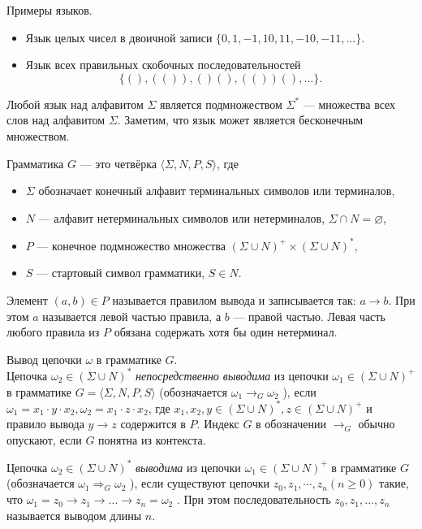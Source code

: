 \begin{example}
	
	Примеры языков.
	
	\begin{itemize}
		\item Язык целых чисел в двоичной записи $\{0, 1, -1, 10, 11, -10, -11, \dots\}.$
		\item Язык всех правильных скобочных последовательностей $$\{(), (()), ()(), (())(), \dots\}.$$
	\end{itemize}
\end{example}

Любой язык над алфавитом $\Sigma$ является подмножеством $\Sigma^*$ --- множества всех слов над алфавитом $\Sigma$. Заметим, что язык может является бесконечным множеством.

\begin{definition} 
	Грамматика $G$ --- это четвёрка $\langle \Sigma, N, P, S \rangle$, где 
	\begin{itemize}
		\item $\Sigma$ обозначает конечный алфавит терминальных символов или терминалов, 
		\item $N$ --- алфавит нетерминальных символов или нетерминалов, $\Sigma \cap N=\varnothing$, 
		\item $P$ --- конечное подмножество множества $(\Sigma \cup N)^+ \times (\Sigma \cup N)^*$,  
		
		\item $S$ --- стартовый символ грамматики, $S  \in N$. 
	\end{itemize}
\end{definition}

Элемент $(a, b) \in P$ называется правилом вывода и записывается так: $a \rightarrow b$. При этом $a$ называется левой частью правила, а $b$ --- правой частью. Левая часть любого правила из $P$ обязана содержать хотя бы один нетерминал.


\begin{definition}    
	Вывод цепочки $\omega$ в грамматике $G$.\\  Цепочка $\omega_2 \in  ( \Sigma \cup  N )^*$ \textit{непосредственно выводима} из цепочки   $\omega_1 \in ( \Sigma \cup N )^+$ в грамматике $G=\langle \Sigma, N, P, S \rangle$  (обозначается  $\omega_1 \rightarrow_G \omega_2$ ), если  $\omega_1 = x_1 \cdot y \cdot x_2, \omega_2 = x_1 \cdot z \cdot x_2$, где $x_1, x_2, y \in   (\Sigma \cup N )^*, z \in  (\Sigma \cup N )^+$ и правило вывода  $y \rightarrow z$  содержится в $P$. Индекс $G$ в обозначении $\rightarrow_G$ обычно опускают, если $G$ понятна из контекста.
	
	Цепочка $\omega_2 \in  (\Sigma \cup  N )^*$  \textit{выводима} из цепочки  $\omega_1 \in (\Sigma \cup  N)^+$ в грамматике $G$  (обозначается  $\omega_1 \Rightarrow_G \omega_2$ ), если существуют цепочки $z_0, z_1, \cdots, z_n  (n \geq 0)$ такие, что $\omega_1 = z_0 \rightarrow z_1 \rightarrow ... \rightarrow z_n = \omega_2$ . При этом последовательность $z_0, z_1, ..., z_n$ называется выводом длины $n$.
\end{definition}

